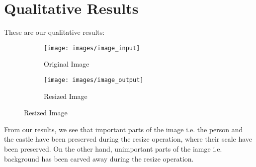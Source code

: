 \documentclass[a4paper]{article}
\begin{document}
	\section{Qualitative Results}
	
	These are our qualitative results:
	\begin{figure}[ht]
		\centering
		\begin{subfigure}{0.45\linewidth}
			\texttt{[image: images/image\_input]}
			\caption{Original Image}
			\label{fig:imageinput}
		\end{subfigure}
		\begin{subfigure}{0.45\linewidth}
			\centering
			\texttt{[image: images/image\_output]}
			\caption{Resized Image}
			\label{fig:imageoutput}
		\end{subfigure}
	\end{figure}
	
	From our results, we see that important parts of the image i.e. the person and the castle have been preserved during the resize operation, where their scale have been preserved. On the other hand, unimportant parts of the iamge i.e. background has been carved away during the resize operation.
	

	
	
\end{document}
